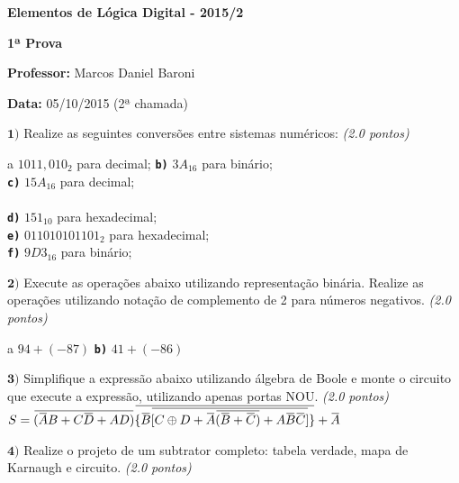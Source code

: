 \documentclass[12pt]{article}
\newcommand{\exerc}[3]{ \vspace*{25pt} {$\mathbf{#1)}$} #2 \hfill {\it #3} }
\newcommand{\exitem}[2]{ \texttt{\bf #1)} #2 \\ }
\newcommand*\xor{\mathbin{\oplus}}
\renewcommand{\neg}[1]{ 
  \mkern 1.5mu\overline{\mkern-1.5mu#1\mkern-1.5mu}\mkern 1.5mu
}
\newenvironment{exitems}[1]{
\\
\hspace*{30pt}
\begin{minipage}{0.8\textwidth}
\begin{multicols}{#1} 
}{
\end{multicols}
\end{minipage}
}
\begin{document}

\begin{center}
{\Large \bf Elementos de Lógica Digital - 2015/2}
\end{center}

{\large \bf 1ª Prova}

{\bf Professor:} Marcos Daniel Baroni

{\bf Data:} 05/10/2015 (2ª chamada)


\exerc{1}{Realize as seguintes conversões entre sistemas numéricos:}{(2.0 pontos)}
\begin{exitems}{2}
	\exitem{a}{ $1011,010_2$ para decimal;}
	\exitem{b}{ $3A_{16}$ para binário;}
	\exitem{c}{ $15A_{16}$ para decimal;}
	\\
	\exitem{d}{ $151_{10}$ para hexadecimal;}
	\exitem{e}{ $0110 1010 1101_{2}$ para hexadecimal;}
	\exitem{f}{ $9D3_{16}$ para binário;}
\end{exitems}

\exerc{2}{Execute as operações abaixo utilizando representação binária. Realize as operações utilizando notação de complemento de 2 para números negativos.}{(2.0 pontos)}
\begin{exitems}{2}
	\exitem{a}{ $94 + (-87)$}
	\exitem{b}{ $41 + (-86)$}
\end{exitems}

\exerc{3}{Simplifique a expressão abaixo utilizando álgebra de Boole e monte o circuito que execute a expressão, utilizando apenas portas NOU.}{(2.0 pontos)}
$S = \neg{(\neg{A}B + C\neg{D} + AD)}\neg{\{\neg{B}\neg{[C\xor D + \neg{A}\neg{(\neg{B} + \neg{C})} + A\neg{B}\neg{C}]}\}}+\neg{A}$

\exerc{4}{Realize o projeto de um subtrator completo: tabela verdade, mapa de Karnaugh e circuito.}{(2.0 pontos)}
\end{document}

